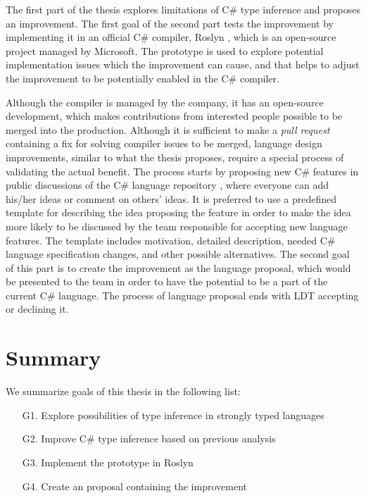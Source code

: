 The first part of the thesis explores limitations of C\# type inference and proposes an improvement.
The first goal of the second part tests the improvement by implementing it in an official C\# compiler, Roslyn \cite{online:langRepo}, which is an open-source project managed by Microsoft.
The prototype is used to explore potential implementation issues which the improvement can cause, and that helps to adjust the improvement to be potentially enabled in the C\# compiler.
\par
Although the compiler is managed by the company, it has an open-source development, which makes contributions from interested people possible to be merged into the production.
Although it is sufficient to make a \textit{pull request} containing a fix for solving compiler issues to be merged, language design improvements, similar to what the thesis proposes, require a special process of validating the actual benefit.
The process starts by proposing new C\# features in public discussions of the C\# language repository \cite{online:langRepo}, where everyone can add his/her ideas or comment on others' ideas. 
It is preferred to use a predefined template \cite{online:proposalTemplate} for describing the idea proposing the feature in order to make the idea more likely to be discussed by the team responsible for accepting new language features. 
The template includes motivation, detailed description, needed C\# language specification \cite{online:langSpec} changes, and other possible alternatives.
The second goal of this part is to create the improvement as the language proposal, which would be presented to the team in order to have the potential to be a part of the current C\# language.
The process of language proposal ends with \ac{LDT} accepting or declining it. 

\section{Summary}

We summarize goals of this thesis in the following list:

\begin{enumerate}
  \item[G1.] Explore possibilities of type inference in strongly typed languages
  \item[G2.] Improve C\# type inference based on previous analysis
  \item[G3.] Implement the prototype in Roslyn
  \item[G4.] Create an proposal containing the improvement
\end{enumerate}